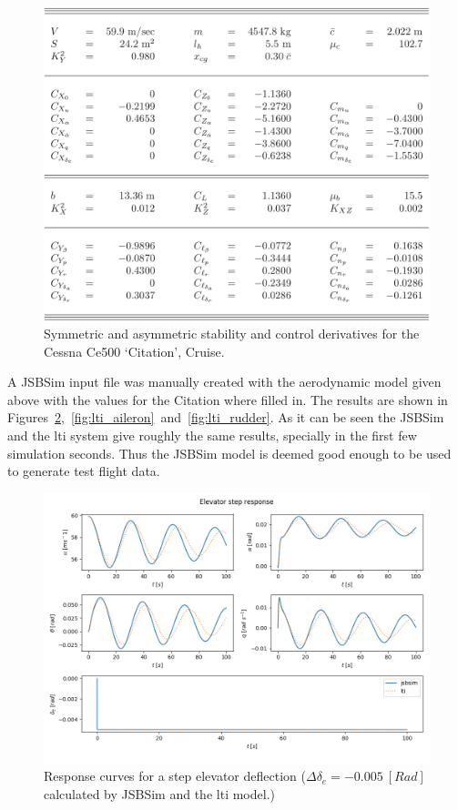 \begin{figure}
\centering
\includegraphics[width=14cm]{figures/tablecoefs.png}
\caption{Symmetric and asymmetric stability and control derivatives for the Cessna Ce500 ‘Citation’, Cruise\cite{fdreader}.}
\label{fig:coeftable}
\end{figure}


A JSBSim input file was manually created with the aerodynamic model given above with the values for the Citation where filled in. The results are shown in Figures~\ref{fig:lti_elevator},~\ref{fig:lti_aileron}~and~\ref{fig:lti_rudder}. As it can be seen the JSBSim and the \gls{lti} system give roughly the same results, specially in the first few simulation seconds. Thus the JSBSim model is deemed good enough to be used to generate test flight data.


\begin{figure}
\centering
\includegraphics[width=14cm]{figures/lti_elevator}
\caption{Response curves for a step elevator deflection ($\Delta\delta_e=-0.005\ [Rad]$ calculated by JSBSim and the \gls{lti} model.)}
\label{fig:lti_elevator}
\end{figure}

